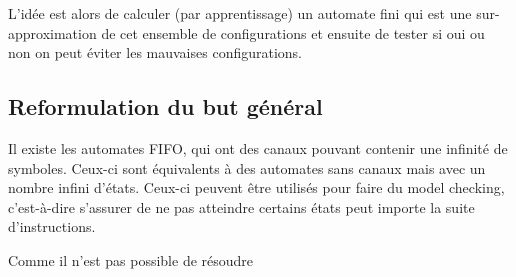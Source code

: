 L’idée est alors de calculer (par apprentissage) un automate fini qui est une sur-approximation de cet ensemble de configurations et ensuite de tester si oui ou non on peut éviter les mauvaises configurations.


\subsection{Reformulation du but général}

Il existe les automates FIFO, qui ont des canaux pouvant contenir une infinité de symboles. Ceux-ci sont équivalents à des automates sans canaux mais avec un nombre infini d'états. Ceux-ci peuvent être utilisés pour faire du model checking, c'est-à-dire s'assurer de ne pas atteindre certains états peut importe la suite d'instructions.

Comme il n'est pas possible de résoudre 


